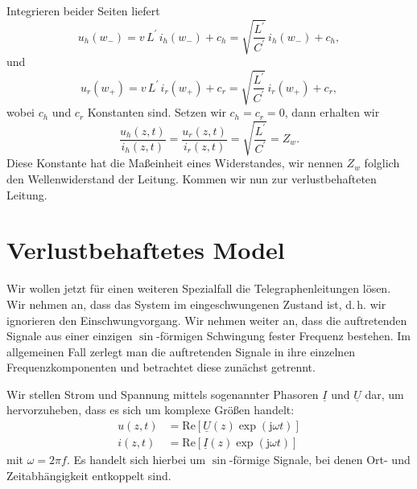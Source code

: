 \documentclass[paper=a4, parskip=half-, ngerman, fontsize=11pt]{scrreprt}
\begin{document}
Integrieren beider Seiten liefert
\begin{equation*}
    u_{h}(w_{-}) = v \, L^{\prime} \, i_{h}(w_{-}) + c_{h} = \sqrt{\frac{L^{\prime}}{C^{\prime}}} \, i_{h}(w_{-}) +
    c_{h},
\end{equation*}
und
\begin{equation*}
    u_{r}(w_{+}) = v \, L^{\prime} \, i_{r}(w_{+}) + c_{r} = \sqrt{\frac{L^{\prime}}{C^{\prime}}} \, i_{r}(w_{+}) +
    c_{r},
\end{equation*}
wobei $c_{h}$ und $c_{r}$ Konstanten sind. Setzen wir $c_{h} = c_{r} = 0$, dann erhalten wir
\begin{equation*}
    \frac{u_{h}(z, t)}{i_{h}(z, t)} = \frac{u_{r}(z, t)}{i_{r}(z, t)} = \sqrt{\frac{L^{\prime}}{C^{\prime}}} = Z_{w}.
\end{equation*}
Diese Konstante hat die Maßeinheit eines Widerstandes, wir nennen $Z_{w}$ folglich den Wellenwiderstand der Leitung.
Kommen wir nun zur verlustbehafteten Leitung.

\section{Verlustbehaftetes Model}
Wir wollen jetzt für einen weiteren Spezialfall die Telegraphenleitungen lösen. Wir nehmen an, dass das System im
eingeschwungenen Zustand ist, d.\,h. wir ignorieren den Einschwungvorgang. Wir nehmen weiter an, dass die auftretenden
Signale aus einer einzigen $\sin$-förmigen Schwingung fester Frequenz bestehen. Im allgemeinen Fall zerlegt man die
auftretenden Signale in ihre einzelnen Frequenzkomponenten und betrachtet diese zunächst getrennt.

Wir stellen Strom und Spannung mittels sogenannter Phasoren $\underline{I}$ und $\underline{U}$ dar, um hervorzuheben,
dass es sich um komplexe Größen handelt:
\begin{align}
    u(z, t) &= \mathrm{Re} \left[ \underline{U}(z) \exp(\mathrm{j} \omega t) \right] \label{eq:Spannung} \\
    i(z, t) &= \mathrm{Re} \left[ \underline{I}(z) \exp(\mathrm{j} \omega t) \right]
\end{align}
mit $\omega = 2 \pi f$. Es handelt sich hierbei um $\sin$-förmige Signale, bei denen Ort- und Zeitabhängigkeit
entkoppelt sind.
\end{document}
